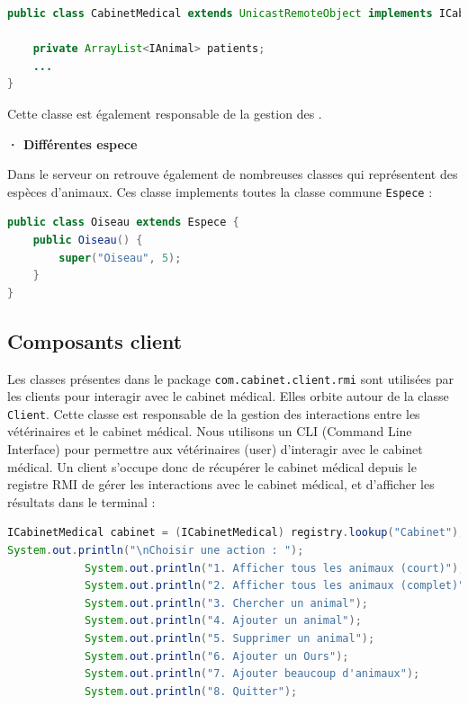 \documentclass{article} %
\begin{document}
\begin{lstlisting}[language=Java]
public class CabinetMedical extends UnicastRemoteObject implements ICabinetMedical {

    private ArrayList<IAnimal> patients;
    ...
}
\end{lstlisting}

Cette classe est également responsable de la gestion des .


\bigskip
\textbf{· Différentes espece}
\bigskip

Dans le serveur on retrouve également de nombreuses classes qui représentent des espèces d'animaux.
Ces classe implements toutes la classe commune \texttt{Espece} : 

\begin{lstlisting}[language=Java]
public class Oiseau extends Espece {
    public Oiseau() {
        super("Oiseau", 5);
    }
}
\end{lstlisting}


\subsection{Composants client}

Les classes présentes dans le package \texttt{com.cabinet.client.rmi} sont utilisées par les clients
pour interagir avec le cabinet médical. Elles orbite autour de la classe \texttt{Client}.
Cette classe est responsable de la gestion des interactions entre les vétérinaires et le cabinet médical.
Nous utilisons un CLI (Command Line Interface) pour permettre aux vétérinaires (user) d'interagir avec le cabinet médical.
Un client s'occupe donc de récupérer le cabinet médical depuis le registre RMI de gérer les interactions avec le cabinet médical,
et d'afficher les résultats dans le terminal :

\begin{lstlisting}[language=Java]
ICabinetMedical cabinet = (ICabinetMedical) registry.lookup("Cabinet");
System.out.println("\nChoisir une action : ");
            System.out.println("1. Afficher tous les animaux (court)");
            System.out.println("2. Afficher tous les animaux (complet)");
            System.out.println("3. Chercher un animal");
            System.out.println("4. Ajouter un animal");
            System.out.println("5. Supprimer un animal");
            System.out.println("6. Ajouter un Ours");
            System.out.println("7. Ajouter beaucoup d'animaux");
            System.out.println("8. Quitter");
\end{lstlisting}
\end{document}
